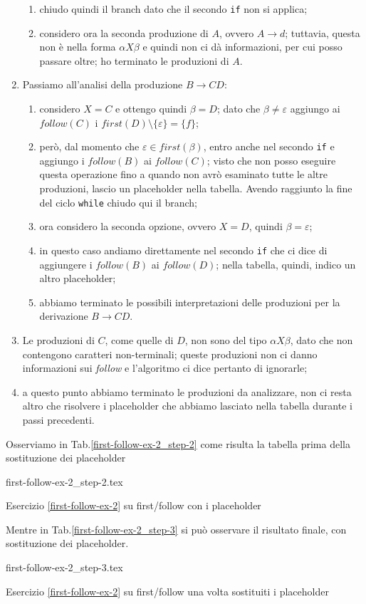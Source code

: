 \documentclass[class=book, crop=false, oneside, 12pt]{standalone}
\begin{document}
\begin{enumerate}
\begin{enumerate}
        \item chiudo quindi il branch dato che il secondo \texttt{if} non si applica;
        \item considero ora la seconda produzione di \(A\), ovvero \(A \to d\); tuttavia, questa non è nella forma \(\alpha X \beta\) e quindi non ci dà informazioni, per cui posso passare oltre; ho terminato le produzioni di \(A\).
    \end{enumerate}
    \item Passiamo all'analisi della produzione \(B \to CD\):
    \begin{enumerate}
        \item considero \(X = C\) e ottengo quindi \(\beta = D\); dato che \(\beta \neq \varepsilon\) aggiungo ai \(follow(C)\) i \(first(D) \setminus \{\varepsilon\} = \{f\}\);
        \item però, dal momento che \(\varepsilon \in first(\beta)\), entro anche nel secondo \texttt{if} e aggiungo i \(follow(B)\) ai \(follow(C)\); visto che non posso eseguire questa operazione fino a quando non avrò esaminato tutte le altre produzioni, lascio un placeholder nella tabella. Avendo raggiunto la fine del ciclo \texttt{while} chiudo qui il branch;
        \item ora considero la seconda opzione, ovvero \(X = D\), quindi \(\beta = \varepsilon\);
        \item in questo caso andiamo direttamente nel secondo \texttt{if} che ci dice di aggiungere i \(follow(B)\) ai \(follow(D)\); nella tabella, quindi, indico un altro placeholder;
        \item abbiamo terminato le possibili interpretazioni delle produzioni per la derivazione \(B \to CD\).
    \end{enumerate}
    \item Le produzioni di \(C\), come quelle di \(D\), non sono del tipo \(\alpha X \beta\), dato che non contengono caratteri non-terminali; queste produzioni non ci danno informazioni sui \emph{follow} e l’algoritmo ci dice pertanto di ignorarle;
    \item a questo punto abbiamo terminato le produzioni da analizzare, non ci resta altro che risolvere i placeholder che abbiamo lasciato nella tabella durante i passi precedenti.
\end{enumerate}
Osserviamo in Tab.\ref{first-follow-ex-2_step-2} come risulta la tabella prima della sostituzione dei placeholder
\begin{table}[H]
	\centering
	{first-follow-ex-2_step-2.tex}
    \caption{Esercizio \ref{first-follow-ex-2} su first/follow con i placeholder}
    \label{first-follow-ex-2_step-2}
\end{table}
Mentre in Tab.\ref{first-follow-ex-2_step-3} si può osservare il risultato finale, con sostituzione dei placeholder.
\begin{table}[H]
	\centering
	{first-follow-ex-2_step-3.tex}
    \caption{Esercizio \ref{first-follow-ex-2} su first/follow una volta sostituiti i placeholder}
    \label{first-follow-ex-2_step-3}
\end{table}
\end{document}
